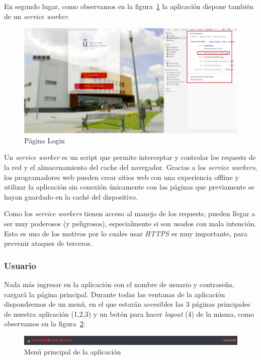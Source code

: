 \documentclass[a4paper, 12pt]{book}
\begin{document}
\clearpage
	En segundo lugar, como observamos en la figura~\ref{fig:principalWorker} la aplicación dispone también de un \textit{service worker}.
	
	\begin{figure}[h!]
  	\centering
  	\includegraphics[width=16cm, keepaspectratio]{img/principalWorker.png}
  	\caption{Página Login}\label{fig:principalWorker}
	\end{figure}

	Un \emph{service worker} es un script que permite interceptar y controlar los requests de la red y el almacenamiento del cache del navegador. Gracias a los \textit{service workers}, los programadores web pueden crear sitios web con una experiencia offline y utilizar la aplicación sin conexión únicamente con las páginas que previamente se hayan guardado en la caché del dispositivo.
	
	Como los \textit{service workers} tienen acceso al manejo de los requests, pueden llegar a ser muy poderosos (y peligrosos), especialmente si son usados con mala intención. Esto es uno de los motivos por lo cuales usar \textit{HTTPS} es muy importante, para prevenir ataques de terceros.

\clearpage

\subsubsection{Usuario}
	Nada más ingresar en la aplicación con el nombre de usuario y contraseña, cargará la página principal. Durante todas las ventanas de la aplicación dispondremos de un menú, en el que estarán accesibles las 3 páginas principales de nuestra aplicación (1,2,3) y un botón para hacer \textit{logout} (4) de la misma, como observamos en la figura~\ref{fig:menu}:
	\begin{figure}[h!]
  	\centering
  	\includegraphics[width=16cm, keepaspectratio]{img/menu.png}
  	\caption{Menú principal de la aplicación}\label{fig:menu}
	\end{figure}
	
\end{document}
